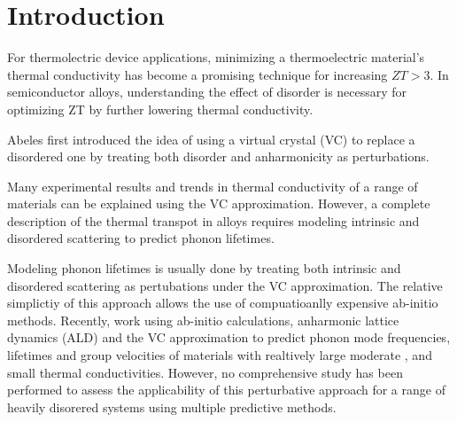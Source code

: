 \documentclass[aps,prb,twocolumn,superscriptaddress,preprintnumbers,amsmath,amssymb,floatfix]{revtex4}
\begin{document}
\maketitle
\clearpage
\section{\label{S:Intro}Introduction}

For thermolectric device applications, minimizing a thermoelectric 
material's thermal 
conductivity has become a promising technique for increasing $ZT>3$.
\cite{chen_recent_2003,dresselhaus_new_2007} In semiconductor alloys, 
understanding the effect of disorder is necessary for optimizing 
ZT by further lowering thermal conductivity.
\cite{he_thermoelectric_2006,huang_filler-reduced_2010,
toberer_phonon_2011,tian_phonon_2012}

Abeles first introduced the idea of using a virtual crystal (VC) to 
replace a disordered one by treating both
disorder and anharmonicity as perturbations.\cite{abeles_lattice_1963} 

Many experimental results and trends in thermal conductivity 
of a range of materials 
can be explained using the VC approximation.  
However, a complete 
description of the thermal transpot in alloys requires modeling intrinsic 
and 
disordered scattering to predict phonon lifetimes.

Modeling phonon lifetimes is usually done by treating both intrinsic 
and disordered scattering as pertubations under the VC approximation. 
The relative simplictiy 
of this approach allows the use of compuatioanlly expensive ab-initio 
methods. Recently, work using ab-initio calculations, anharmonic 
lattice dynamics (ALD) and the VC 
approximation to predict phonon mode frequencies, lifetimes and 
group velocities of materials with realtively
large\cite{garg_role_2011,lindsay_thermal_2012} 
moderate \cite{thermal_shiomi_2011}, and 
small \cite{tian_phonon_2012} 
thermal conductivities. However, no comprehensive study has been performed 
to assess the applicability of this perturbative approach for a range 
of heavily disorered systems using multiple predictive methods.
\end{document}
